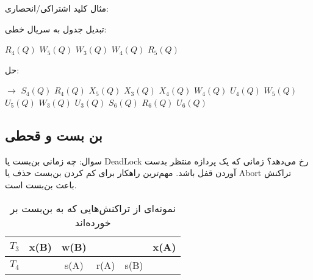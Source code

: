 \documentclass[a4paper]{article}
\begin{document}
مثال کلید اشتراکی/انحصاری:

\begin{LTR}
    \begin{table}[h]
        \centering
    \end{table}
\end{LTR}

تبدیل جدول به سریال خطی:

\begin{LTR}
    $R_{4}(Q)$ $W_{5}(Q)$ $W_{3}(Q)$ $W_{4}(Q)$ $R_{5}(Q)$
\end{LTR}

حل:

\begin{LTR}
    \centering
    $\rightarrow$ 
    $S_{4}(Q)$ $R_{4}(Q)$ 
    $X_{5}(Q)$ $X_{3}(Q)$
    $X_{4}(Q)$ $W_{4}(Q)$ $U_{4}(Q)$
    $W_{5}(Q)$ $U_{5}(Q)$
    $W_{3}(Q)$ $U_{3}(Q)$
    $S_{6}(Q)$ $R_{6}(Q)$ $U_{6}(Q)$
\end{LTR}

\newpage

\subsection{بن بست و قحطی}

سوال: چه زمانی بن‌بست یا DeadLock رخ می‌دهد؟ زمانی که یک پردازه منتظر بدست آوردن
قفل باشد. مهم‌ترین راهکار برای کم کردن بن‌بست حذف یا Abort تراکنش باعث بن‌بست
است.

\begin{LTR}
    \begin{table}[h]
        \begin{RTL}
            \caption{نمونه‌ای از تراکنش‌هایی که به بن‌بست بر خورده‌اند}
        \end{RTL}
        \centering
            \begin{tabular}{c|c|c|c|c|c}
                $T_{3}$ & x(B) & w(B) & & & x(A) \\ \hline
                $T_{4}$ & & s(A) & r(A) & s(B) & \\
            \end{tabular}
    \end{table}
\end{LTR}
\end{document}
